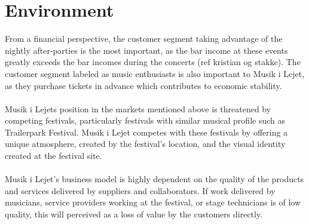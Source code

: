 \section{Environment}
From a financial perspective, the customer segment taking advantage of the nightly after-parties is the most important, as the bar income at these events greatly exceeds the bar incomes during the concerts (ref kristian og stakke). The customer segment labeled as music enthusiasts is also important to Musik i Lejet, as they purchase tickets in advance which contributes to economic stability.
\\ \\
Musik i Lejets position in the markets mentioned above is threatened by competing festivals, particularly festivals with similar musical profile such as Trailerpark Festival. Musik i Lejet competes with these festivals by offering a unique atmosphere, created by the festival's location, and the visual identity created at the festival site.
\\ \\
Musik i Lejet's business model is highly dependent on the quality of the products and services delivered by suppliers and collaborators. If work delivered by musicians, service providers working at the festival, or stage technicians is of low quality, this will perceived as a loss of value by the customers directly.


